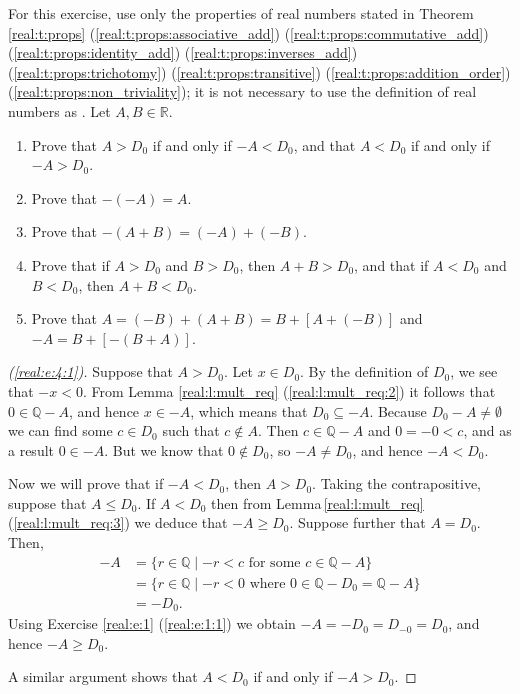 \Newpage
\begin{exercise} %
	\label{real:e:4}
	For this exercise, use only the properties of real numbers stated in Theorem \ref{real:t:props} (\ref{real:t:props:associative_add}) (\ref{real:t:props:commutative_add}) (\ref{real:t:props:identity_add}) (\ref{real:t:props:inverses_add}) (\ref{real:t:props:trichotomy}) (\ref{real:t:props:transitive}) (\ref{real:t:props:addition_order}) (\ref{real:t:props:non_triviality}); it is not necessary to use the definition of real numbers as . Let $A, B \in \mathbb{R}$.
	\begin{enumerate}
		\item \label{real:e:4:1}
		      Prove that $A > D_0$ if and only if $-A < D_0$, and that $A < D_0$ if and only if $-A > D_0$.
		\item \label{real:e:4:2}
		      Prove that $-(-A) = A$.
		\item \label{real:e:4:3}
		      Prove that $-(A + B) = (-A) + (-B)$.
		\item \label{real:e:4:4}
		      Prove that if $A > D_0$ and $B > D_0$, then $A + B > D_0$, and that if $A < D_0$ and $B < D_0$, then $A + B < D_0$.
		\item \label{real:e:4:5}
		      Prove that $A = (-B) + (A + B) = B + [A + (-B)]$ and $-A = B + [-(B + A)]$.
	\end{enumerate}
\end{exercise}

\begin{proof}[(\ref{real:e:4:1})]
	Suppose that $A > D_0$. Let $x \in D_0$. By the definition of $D_0$, we see that $-x < 0$. From Lemma \ref{real:l:mult_req} (\ref{real:l:mult_req:2}) it follows that $0 \in \mathbb{Q} - A$, and hence $x \in -A$, which means that $D_0 \subseteq -A$. Because $D_0 - A \not= \emptyset$ we can find some $c \in D_0$ such that $c \notin A$. Then $c \in \mathbb{Q} - A$ and $0 = -0 < c$, and as a result $0 \in -A$. But we know that $0 \notin D_0$, so $-A \neq D_0$, and hence $-A < D_0$.

	Now we will prove that if $-A < D_0$, then $A > D_0$. Taking the contrapositive, suppose that $A \leq D_0$. If $A < D_0$ then from Lemma\,\ref{real:l:mult_req}\,(\ref{real:l:mult_req:3}) we deduce that $-A \geq D_0$. Suppose further that $A = D_0$. Then,
	\begin{align*}
		-A & = \{ r \in \mathbb{Q} \mid -r < c \text{ for some } c \in \mathbb{Q} - A \}                 \\
		   & = \{ r \in \mathbb{Q} \mid -r < 0 \text{ where } 0 \in \mathbb{Q} - D_0 = \mathbb{Q} - A \} \\
		   & = -D_0.
	\end{align*}
	Using Exercise \ref{real:e:1} (\ref{real:e:1:1}) we obtain $-A = -D_0 = D_{-0} = D_0$, and hence $-A \geq D_0$.

	A similar argument shows that $A < D_0$ if and only if $-A > D_0$.
\end{proof}


